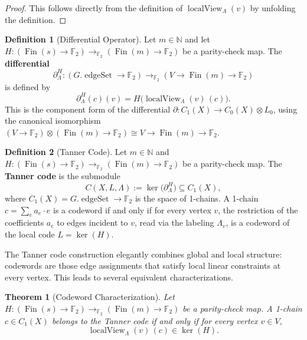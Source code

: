 \documentclass[11pt]{article}
\theoremstyle{plain}
\newtheorem*{theorem}{Theorem}
\theoremstyle{definition}
\newtheorem*{definition}{Definition}
\theoremstyle{remark}
\renewcommand{\ker}{\operatorname{ker}}
\begin{document}
\begin{proof}
This follows directly from the definition of $\operatorname{localView}_\Lambda(v)$ by unfolding the definition.
\end{proof}

\begin{definition}[Differential Operator]
Let $m \in \mathbb{N}$ and let $H : (\operatorname{Fin}(s) \to \mathbb{F}_2) \to_{\mathbb{F}_2} (\operatorname{Fin}(m) \to \mathbb{F}_2)$ be a parity-check map. The \textbf{differential}
\[
\partial_\Lambda^H : (G.\operatorname{edgeSet} \to \mathbb{F}_2) \to_{\mathbb{F}_2} (V \to \operatorname{Fin}(m) \to \mathbb{F}_2)
\]
is defined by
\[
\partial_\Lambda^H(c)(v) = H\bigl(\operatorname{localView}_\Lambda(v)\,(c)\bigr).
\]
This is the component form of the differential $\partial : C_1(X) \to C_0(X) \otimes L_0$, using the canonical isomorphism $(V \to \mathbb{F}_2) \otimes (\operatorname{Fin}(m) \to \mathbb{F}_2) \cong V \to \operatorname{Fin}(m) \to \mathbb{F}_2$.
\end{definition}

\begin{definition}[Tanner Code]
Let $m \in \mathbb{N}$ and $H : (\operatorname{Fin}(s) \to \mathbb{F}_2) \to_{\mathbb{F}_2} (\operatorname{Fin}(m) \to \mathbb{F}_2)$ be a parity-check map. The \textbf{Tanner code} is the submodule
\[
C(X, L, \Lambda) := \ker\bigl(\partial_\Lambda^H\bigr) \subseteq C_1(X),
\]
where $C_1(X) = G.\operatorname{edgeSet} \to \mathbb{F}_2$ is the space of 1-chains. A 1-chain $c = \sum_e a_e \cdot e$ is a codeword if and only if for every vertex $v$, the restriction of the coefficients $a_e$ to edges incident to $v$, read via the labeling $\Lambda_v$, is a codeword of the local code $L = \ker(H)$.
\end{definition}

The Tanner code construction elegantly combines global and local structure: codewords are those edge assignments that satisfy local linear constraints at every vertex. This leads to several equivalent characterizations.

\begin{theorem}[Codeword Characterization]
Let $H : (\operatorname{Fin}(s) \to \mathbb{F}_2) \to_{\mathbb{F}_2} (\operatorname{Fin}(m) \to \mathbb{F}_2)$ be a parity-check map. A 1-chain $c \in C_1(X)$ belongs to the Tanner code if and only if for every vertex $v \in V$,
\[
\operatorname{localView}_\Lambda(v)\,(c) \in \ker(H).
\]
\end{theorem}
\end{document}
